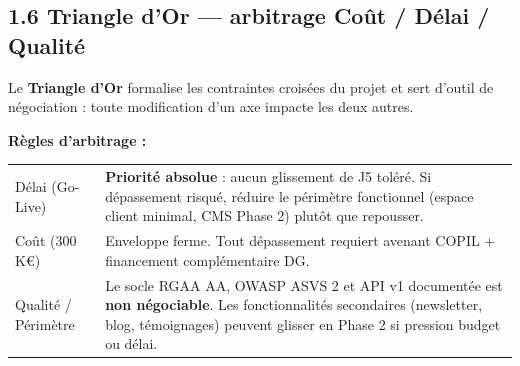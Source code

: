 \documentclass[11pt,a4paper,oneside]{report}
\begin{document}
\subsection*{1.6 Triangle d'Or --- arbitrage Coût / Délai / Qualité}

Le \textbf{Triangle d'Or} formalise les contraintes croisées du projet et sert d'outil de négociation : toute modification d'un axe impacte les deux autres.

\vspace{6pt}
\begin{center}
\end{center}

\vspace{4pt}
\textbf{Règles d'arbitrage :}

\renewcommand{\arraystretch}{1.4}
\begin{tabularx}{\textwidth}{L{4cm} Y}
\toprule
{} &  \\
\midrule
Délai (Go-Live) & \textbf{Priorité absolue} : aucun glissement de J5 toléré. Si dépassement risqué, réduire le périmètre fonctionnel (espace client minimal, CMS Phase 2) plutôt que repousser. \\
Coût (300 K€) & Enveloppe ferme. Tout dépassement requiert avenant COPIL + financement complémentaire DG. \\
Qualité / Périmètre & Le socle RGAA AA, OWASP ASVS 2 et API v1 documentée est \textbf{non négociable}. Les fonctionnalités secondaires (newsletter, blog, témoignages) peuvent glisser en Phase 2 si pression budget ou délai. \\
\bottomrule
\end{tabularx}
\end{document}
